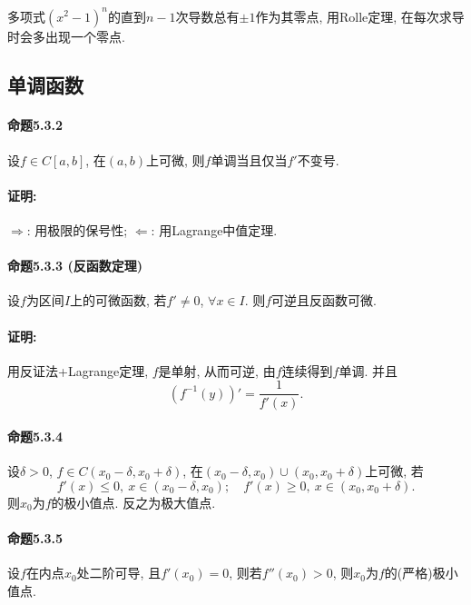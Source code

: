 多项式$\left(x^{2}-1\right)^{n}$的直到$n-1$次导数总有$\pm1$作为其零点, 用Rolle定理,
在每次求导时会多出现一个零点.

\subsection{单调函数}

\paragraph{命题5.3.2}

设$f\in C[a,b]$, 在$(a,b)$上可微, 则$f$单调当且仅当$f'$不变号.

\paragraph{证明:}

$\Longrightarrow$: 用极限的保号性; $\Longleftarrow$: 用Lagrange中值定理.

\paragraph{命题5.3.3 (反函数定理)}

设$f$为区间$I$上的可微函数, 若$f'\ne0$, $\forall x\in I$. 则$f$可逆且反函数可微.

\paragraph{证明:}

用反证法+Lagrange定理, $f$是单射, 从而可逆, 由$f$连续得到$f$单调. 并且
\[
\left(f^{-1}(y)\right)'=\frac{1}{f'(x)}.
\]


\paragraph{命题5.3.4}

设$\delta>0$, $f\in C(x_{0}-\delta,x_{0}+\delta)$, 在$(x_{0}-\delta,x_{0})\cup(x_{0},x_{0}+\delta)$上可微,
若
\[
f'(x)\le0,\ x\in(x_{0}-\delta,x_{0});\quad f'(x)\ge0,\ x\in(x_{0},x_{0}+\delta).
\]
则$x_{0}$为$f$的极小值点. 反之为极大值点.

\paragraph{命题5.3.5}

设$f$在内点$x_{0}$处二阶可导, 且$f'(x_{0})=0$, 则若$f''(x_{0})>0$, 则$x_{0}$为$f$的(严格)极小值点.

